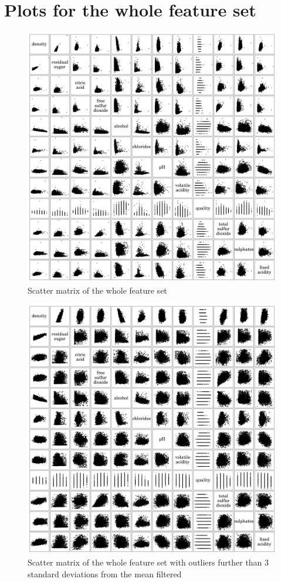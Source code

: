 \documentclass{report}
\begin{document}
\newpage\section{Plots for the whole feature set}

\begin{figure}[H]
\includegraphics[width=\textwidth]{scattermatrix.png}
\caption{Scatter matrix of the whole feature set}\n\end{figure}

\begin{figure}[H]
\includegraphics[width=\textwidth]{scattermatrix_filtered.png}
\caption{Scatter matrix of the whole feature set with outliers further than 3 standard deviations from the mean filtered}\n\end{figure}
\end{document}
